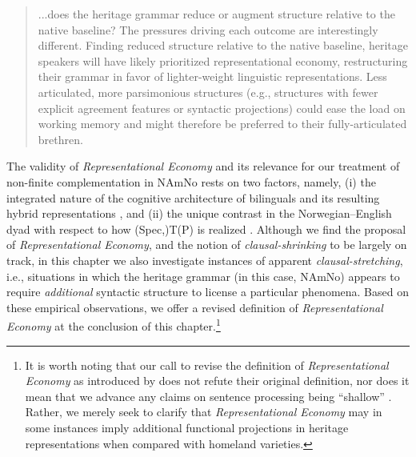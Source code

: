 \documentclass[output=paper,colorlinks,citecolor=brown]{langscibook}
\begin{document}
\begin{quote}
    ...does the heritage grammar reduce or augment structure relative to the native baseline? The pressures driving each outcome are interestingly different. Finding reduced structure relative to the native baseline, heritage speakers will have likely prioritized representational economy, restructuring their grammar in favor of lighter-weight linguistic representations. Less articulated, more parsimonious structures (e.g., structures with fewer explicit agreement features or syntactic projections) could ease the load on working memory and might therefore be preferred to their fully-articulated brethren. 
\end{quote}

The validity of \textit{Representational Economy} and its relevance for our treatment of non-finite complementation in NAmNo rests on two factors, namely, (i) the integrated nature of the cognitive architecture of bilinguals \citep{putnam2018} and its resulting hybrid representations \citep{aboh2015}, and (ii) the unique contrast in the Norwegian--English dyad with respect to how (Spec,)T(P) is realized \citep{sconput20}. Although we find the proposal of \textit{Representational Economy}, and the notion of \textit{clausal-shrinking} to be largely on track, in this chapter we also investigate instances of apparent \textit{clausal-stretching}, i.e., situations in which the heritage grammar (in this case, NAmNo) appears to require \textit{additional} syntactic structure to license a particular phenomena. Based on these empirical observations, we offer a revised definition of \textit{Representational Economy} at the conclusion of this chapter.\footnote{It is worth noting that our call to revise the definition of \textit{Representational Economy} as introduced by \citet{scontras2018} does not refute their original definition, nor does it mean that we advance any claims on sentence processing being ``shallow'' \citep{ferreira02,sanford02,clahsen06}. Rather, we merely seek to clarify that \textit{Representational Economy} may in some instances imply additional functional projections in heritage representations when compared with homeland varieties.}

\end{document}
